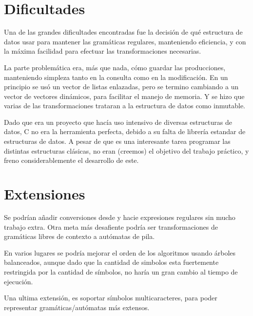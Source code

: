 \documentclass[11pt,a4paper,titlepage]{article}
\begin{document}
\section{Dificultades}

    Una de las grandes dificultades encontradas fue la decisión de qué
    estructura de datos usar para mantener las gramáticas regulares,
    manteniendo eficiencia, y con la máxima facilidad para efectuar las
    transformaciones necesarias.

    La parte problemática era, más que nada, cómo guardar las producciones,
    manteniendo simpleza tanto en la consulta como en la modificación. En un
    principio se usó un vector de listas enlazadas, pero se termino cambiando
    a un vector de vectores dinámicos, para facilitar el manejo de memoria. Y
    se hizo que varias de las transformaciones trataran a la estructura de
    datos como inmutable.

    Dado que era un proyecto que hacía uso intensivo de diversas estructuras
    de datos, C no era la herramienta perfecta, debido a su falta de librería
    estandar de estructuras de datos. A pesar de que es una interesante tarea
    programar las distintas estructuras clásicas, no eran (creemos) el objetivo
    del trabajo práctico, y freno considerablemente el desarrollo de este.


\section{Extensiones}

    Se podrían añadir conversiones desde y hacie expresiones regulares sin
    mucho trabajo extra. Otra meta más desafiente podría ser transformaciones
    de gramáticas libres de contexto a autómatas de pila.

    En varios lugares se podría mejorar el orden de los algoritmos usando
    árboles balanceados, aunque dado que la cantidad de simbolos esta
    fuertemente restringida por la cantidad de símbolos, no haría un gran
    cambio al tiempo de ejecución.

    Una ultima extensión, es soportar símbolos multicaracteres, para poder
    representar gramáticas/autómatas más extensos.
\end{document}
